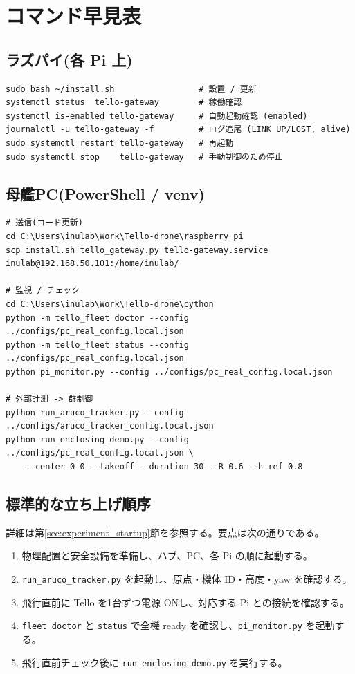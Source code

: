 \documentclass[11pt,a4paper]{ltjsarticle}
\newcommand{\code}[1]{\texttt{\small #1}}
\begin{document}
\section{コマンド早見表}

\subsection{ラズパイ(各 Pi 上)}
\begin{lstlisting}
sudo bash ~/install.sh                 # 設置 / 更新
systemctl status  tello-gateway        # 稼働確認
systemctl is-enabled tello-gateway     # 自動起動確認 (enabled)
journalctl -u tello-gateway -f         # ログ追尾 (LINK UP/LOST, alive)
sudo systemctl restart tello-gateway   # 再起動
sudo systemctl stop    tello-gateway   # 手動制御のため停止
\end{lstlisting}

\subsection{母艦PC(PowerShell / venv)}
\begin{lstlisting}
# 送信(コード更新)
cd C:\Users\inulab\Work\Tello-drone\raspberry_pi
scp install.sh tello_gateway.py tello-gateway.service inulab@192.168.50.101:/home/inulab/

# 監視 / チェック
cd C:\Users\inulab\Work\Tello-drone\python
python -m tello_fleet doctor --config ../configs/pc_real_config.local.json
python -m tello_fleet status --config ../configs/pc_real_config.local.json
python pi_monitor.py --config ../configs/pc_real_config.local.json

# 外部計測 -> 群制御
python run_aruco_tracker.py --config ../configs/aruco_tracker_config.local.json
python run_enclosing_demo.py --config ../configs/pc_real_config.local.json \
    --center 0 0 --takeoff --duration 30 --R 0.6 --h-ref 0.8
\end{lstlisting}

\subsection{標準的な立ち上げ順序}
詳細は第\ref{sec:experiment_startup}節を参照する。要点は次の通りである。
\begin{enumerate}[leftmargin=1.6em]
  \item 物理配置と安全設備を準備し、ハブ、PC、各 Pi の順に起動する。
  \item \code{run\_aruco\_tracker.py} を起動し、原点・機体 ID・高度・yaw を確認する。
  \item 飛行直前に Tello を1台ずつ電源 ONし、対応する Pi との接続を確認する。
  \item \code{fleet doctor} と \code{status} で全機 ready を確認し、\code{pi\_monitor.py} を起動する。
  \item 飛行直前チェック後に \code{run\_enclosing\_demo.py} を実行する。
\end{enumerate}
\end{document}

